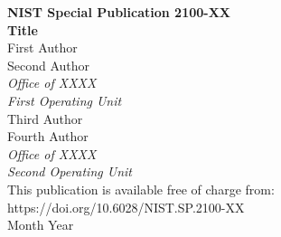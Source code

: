 \documentclass[12pt]{article}
\newcommand{\pubnumber}{2100-XX}
\newcommand{\DOI}{https://doi.org/10.6028/NIST.SP.2100-XX}
\newcommand{\monthyear}{Month Year}
\begin{document}
\begin{titlepage}
\begin{flushright}
\LARGE{\textbf{NIST Special Publication \pubnumber}}\\
\vfill 
\Huge{\textbf{Title}}\\
\vfill
\normalsize First Author\\
Second Author\\
\textit{Office of XXXX}\\
\textit{First Operating Unit}\\
\vspace{12pt}
Third Author\\
Fourth Author\\
\textit{Office of XXXX}\\
\textit{Second Operating Unit}\\
\vfill
\normalsize This publication is available free of charge from:\\
\DOI\\
\vfill
\normalsize \monthyear
\vfill


\end{flushright}
\end{titlepage}
\end{document}
